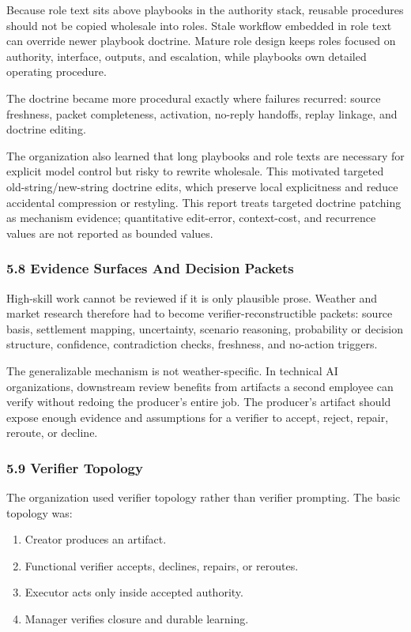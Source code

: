 \documentclass[
]{article}
\providecommand{\tightlist}{%
  \setlength{\itemsep}{0pt}\setlength{\parskip}{0pt}}
\begin{document}
Because role text sits above playbooks in the authority stack, reusable procedures should not be copied wholesale into roles. Stale workflow embedded in role text can override newer playbook doctrine. Mature role design keeps roles focused on authority, interface, outputs, and escalation, while playbooks own detailed operating procedure.

The doctrine became more procedural exactly where failures recurred: source freshness, packet completeness, activation, no-reply handoffs, replay linkage, and doctrine editing.

The organization also learned that long playbooks and role texts are necessary for explicit model control but risky to rewrite wholesale. This motivated targeted old-string/new-string doctrine edits, which preserve local explicitness and reduce accidental compression or restyling. This report treats targeted doctrine patching as mechanism evidence; quantitative edit-error, context-cost, and recurrence values are not reported as bounded values.

\subsubsection{5.8 Evidence Surfaces And Decision Packets}\label{evidence-surfaces-and-decision-packets}

High-skill work cannot be reviewed if it is only plausible prose. Weather and market research therefore had to become verifier-reconstructible packets: source basis, settlement mapping, uncertainty, scenario reasoning, probability or decision structure, confidence, contradiction checks, freshness, and no-action triggers.

The generalizable mechanism is not weather-specific. In technical AI organizations, downstream review benefits from artifacts a second employee can verify without redoing the producer's entire job. The producer's artifact should expose enough evidence and assumptions for a verifier to accept, reject, repair, reroute, or decline.

\subsubsection{5.9 Verifier Topology}\label{verifier-topology}

The organization used verifier topology rather than verifier prompting. The basic topology was:

\begin{enumerate}
\def\labelenumi{\arabic{enumi}.}
\tightlist
\item
  Creator produces an artifact.
\item
  Functional verifier accepts, declines, repairs, or reroutes.
\item
  Executor acts only inside accepted authority.
\item
  Manager verifies closure and durable learning.
\end{enumerate}
\end{document}
